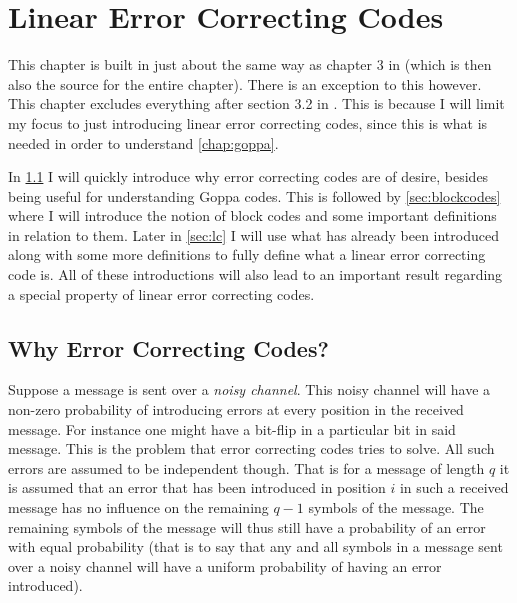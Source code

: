 
\chapter{Linear Error Correcting Codes}
\label{chap:lecc}

This chapter is built in just about the same way as chapter 3 in \cite{vanlint} (which is then also the source for the entire chapter). There is an exception to this however. This chapter excludes everything after section 3.2 in \cite{vanlint}. This is because I will limit my focus to just introducing linear error correcting codes, since this is what is needed in order to understand \cref{chap:goppa}.

In \cref{sec:whyecc} I will quickly introduce why error correcting codes are of desire, besides being useful for understanding Goppa codes. This is followed by \cref{sec:blockcodes} where I will introduce the notion of block codes and some important definitions in relation to them. Later in \cref{sec:lc} I will use what has already been introduced along with some more definitions to fully define what a linear error correcting code is. All of these introductions will also lead to an important result regarding a special property of linear error correcting codes.



\section{Why Error Correcting Codes?}
\label{sec:whyecc}
Suppose a message is sent over a \emph{noisy channel}. This noisy channel will have a non-zero probability of introducing errors at every position in the received message. For instance one might have a bit-flip in a particular bit in said message. This is the problem that error correcting codes tries to solve. All such errors are assumed to be independent though. That is for a message of length $q$ it is assumed that an error that has been introduced in position $i$ in such a received message has no influence on the remaining $q-1$ symbols of the message. The remaining symbols of the message will thus still have a probability of an error with equal probability (that is to say that any and all symbols in a message sent over a noisy channel will have a uniform probability of having an error introduced).



